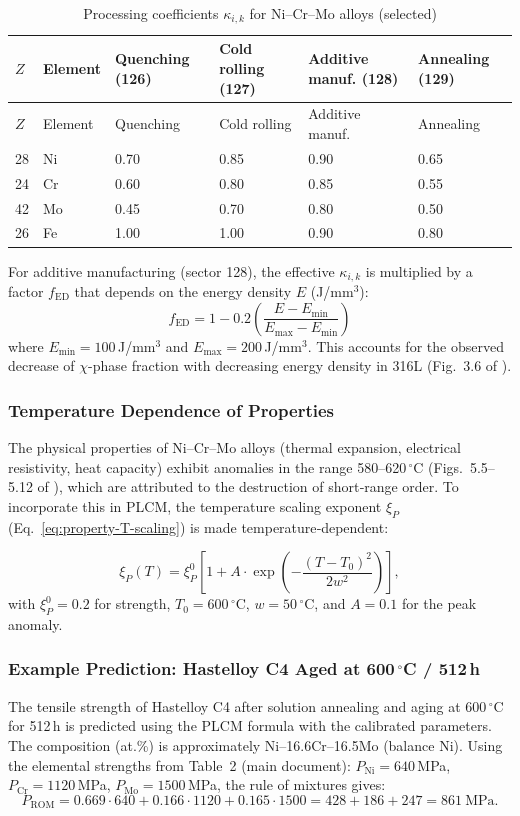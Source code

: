 \documentclass[12pt,a4paper]{article}
\begin{document}
	\begin{longtable}{p{1.5cm} p{1.2cm} p{1.8cm} p{1.8cm} p{1.8cm} p{1.8cm}}
		\caption{Processing coefficients \(\kappa_{i,k}\) for Ni–Cr–Mo alloys (selected)}\label{tab:nicrmo_kappa_ik}\\
		\toprule
		\(Z\) & Element & Quenching (126) & Cold rolling (127) & Additive manuf. (128) & Annealing (129) \\
		\midrule
		\endfirsthead
		\toprule
		\(Z\) & Element & Quenching & Cold rolling & Additive manuf. & Annealing \\
		\midrule
		\endhead
		28 & Ni & 0.70 & 0.85 & 0.90 & 0.65 \\
		24 & Cr & 0.60 & 0.80 & 0.85 & 0.55 \\
		42 & Mo & 0.45 & 0.70 & 0.80 & 0.50 \\
		26 & Fe & 1.00 & 1.00 & 0.90 & 0.80 \\
		\bottomrule
	\end{longtable}
	
	For additive manufacturing (sector 128), the effective \(\kappa_{i,k}\) is multiplied by a factor \(f_{\text{ED}}\) that depends on the energy density \(E\) (J/mm\(^3\)):
	\[
	f_{\text{ED}} = 1 - 0.2\left(\frac{E - E_{\text{min}}}{E_{\text{max}} - E_{\text{min}}}\right)
	\]
	where \(E_{\text{min}}=100\)\,J/mm\(^3\) and \(E_{\text{max}}=200\)\,J/mm\(^3\). This accounts for the observed decrease of \(\chi\)-phase fraction with decreasing energy density in 316L (Fig.~3.6 of \cite{dis2025}).
	
	\subsubsection{Temperature Dependence of Properties}
	The physical properties of Ni–Cr–Mo alloys (thermal expansion, electrical resistivity, heat capacity) exhibit anomalies in the range 580–620\,\(^{\circ}\)C (Figs.~5.5–5.12 of \cite{dis2025}), which are attributed to the destruction of short‑range order. To incorporate this in PLCM, the temperature scaling exponent \(\xi_P\) (Eq.~\ref{eq:property-T-scaling}) is made temperature‑dependent:
	
	\[
	\xi_P(T) = \xi_P^0 \left[1 + A \cdot \exp\left(-\frac{(T-T_0)^2}{2w^2}\right)\right],
	\]
	with \(\xi_P^0 = 0.2\) for strength, \(T_0 = 600\)\,\(^{\circ}\)C, \(w = 50\)\,\(^{\circ}\)C, and \(A = 0.1\) for the peak anomaly.
	
	\subsubsection{Example Prediction: Hastelloy C4 Aged at 600\,\(^{\circ}\)C / 512\,h}
	The tensile strength of Hastelloy C4 after solution annealing and aging at 600\,\(^{\circ}\)C for 512\,h is predicted using the PLCM formula with the calibrated parameters. The composition (at.\%) is approximately Ni–16.6Cr–16.5Mo (balance Ni). Using the elemental strengths from Table~2 (main document): \(P_{\text{Ni}}=640\)\,MPa, \(P_{\text{Cr}}=1120\)\,MPa, \(P_{\text{Mo}}=1500\)\,MPa, the rule of mixtures gives:
	\[
	P_{\text{ROM}} = 0.669\cdot640 + 0.166\cdot1120 + 0.165\cdot1500 = 428 + 186 + 247 = 861\ \text{MPa}.
	\]
	
\end{document}
